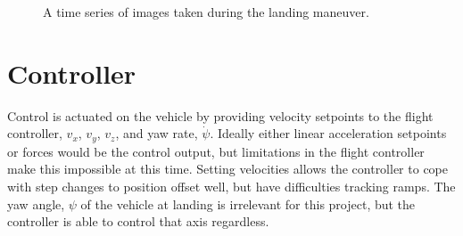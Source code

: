 \begin{figure}
\begin{subfigmatrix}{4}
    \end{subfigmatrix}
    \caption{A time series of images taken during the landing maneuver.}
    \label{f:landing_ims}
\end{figure}

\section{Controller}\label{s:landing:controller}
Control is actuated on the vehicle by providing velocity setpoints to the flight controller, $v_x$, $v_y$,
$v_z$, and yaw rate, $\dot{\psi}$. Ideally either linear acceleration setpoints or forces would be the control
output, but limitations in the flight controller make this impossible at this time. Setting velocities allows
the controller to cope with step changes to position offset well, but have difficulties tracking ramps. The
yaw angle, $\psi$ of the vehicle at landing is irrelevant for this project, but the controller is able to
control that axis regardless.

